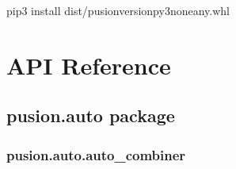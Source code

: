 \documentclass[letterpaper,10pt,english]{sphinxmanual}
\begin{document}
\begin{sphinxVerbatim}[commandchars=\\\{\}]
pip3 install dist/pusion\PYGZhy{}\PYGZlt{}version\PYGZgt{}\PYGZhy{}py3\PYGZhy{}none\PYGZhy{}any.whl
\end{sphinxVerbatim}


\chapter{API Reference}
\label{\detokenize{pusion:api-reference}}\label{\detokenize{pusion::doc}}

\section{pusion.auto package}
\label{\detokenize{pusion.auto:pusion-auto-package}}\label{\detokenize{pusion.auto::doc}}

\subsection{pusion.auto.auto\_combiner}
\label{\detokenize{pusion.auto.auto_combiner:module-pusion.auto.auto_combiner}}\label{\detokenize{pusion.auto.auto_combiner:pusion-auto-auto-combiner}}\label{\detokenize{pusion.auto.auto_combiner:ac-cref}}\label{\detokenize{pusion.auto.auto_combiner::doc}}
\end{document}
